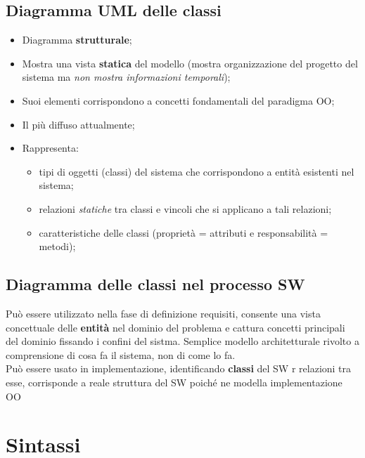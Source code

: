 \documentclass{article}
\begin{document}
    \subsection{Diagramma UML delle classi}
      \begin{itemize}
        \item Diagramma \textbf{strutturale}; 
        \item Mostra una vista \textbf{statica} del modello (mostra organizzazione del progetto del sistema ma \textit{non mostra informazioni temporali});
        \item Suoi elementi corrispondono a concetti fondamentali del paradigma OO;
        \item Il più diffuso attualmente;
        \item Rappresenta: 
          \begin{itemize}
            \item tipi di oggetti (classi) del sistema che corrispondono a entità esistenti nel sistema; 
            \item relazioni \textit{statiche} tra classi e vincoli che si applicano a tali relazioni;
            \item caratteristiche delle classi (proprietà = attributi e responsabilità = metodi);
          \end{itemize}
      \end{itemize}
    \subsection{Diagramma delle classi nel processo SW}
      Può essere utilizzato nella fase di definizione requisiti, consente una vista concettuale delle \textbf{entità} nel dominio del problema e cattura concetti principali del dominio fissando i confini del sistma. Semplice modello architetturale rivolto a comprensione di cosa fa il sistema, non di come lo fa. \\
      Può essere usato in implementazione, identificando \textbf{classi} del SW r relazioni tra esse, corrisponde a reale struttura del SW poiché ne modella implementazione OO
  \section{Sintassi}
\end{document}
